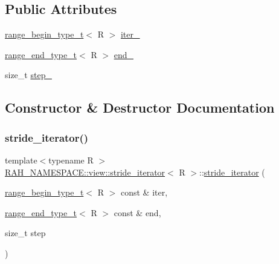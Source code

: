 \subsection*{Public Attributes}
\begin{DoxyCompactItemize}
\item 
\mbox{\hyperlink{namespace_r_a_h___n_a_m_e_s_p_a_c_e_a46705781d6869d5151141f871ced1e9c}{range\+\_\+begin\+\_\+type\+\_\+t}}$<$ R $>$ \mbox{\hyperlink{struct_r_a_h___n_a_m_e_s_p_a_c_e_1_1view_1_1stride__iterator_a361d1587d1a44aaa7b224e220c100c9e}{iter\+\_\+}}
\item 
\mbox{\hyperlink{namespace_r_a_h___n_a_m_e_s_p_a_c_e_aadeb8c12d454f4cc70bf80766871d3b2}{range\+\_\+end\+\_\+type\+\_\+t}}$<$ R $>$ \mbox{\hyperlink{struct_r_a_h___n_a_m_e_s_p_a_c_e_1_1view_1_1stride__iterator_a6c7ad4728a22048143949c4425438e53}{end\+\_\+}}
\item 
size\+\_\+t \mbox{\hyperlink{struct_r_a_h___n_a_m_e_s_p_a_c_e_1_1view_1_1stride__iterator_a66a5065ce36aca56255bd68127b9706f}{step\+\_\+}}
\end{DoxyCompactItemize}


\subsection{Constructor \& Destructor Documentation}
\mbox{\label{struct_r_a_h___n_a_m_e_s_p_a_c_e_1_1view_1_1stride__iterator_a4aeb915e3f46829e15c6dcbb7f7fae56}} 
\subsubsection{\texorpdfstring{stride\_iterator()}{stride\_iterator()}}
{\footnotesize\ttfamily template$<$typename R $>$ \\
\mbox{\hyperlink{struct_r_a_h___n_a_m_e_s_p_a_c_e_1_1view_1_1stride__iterator}{R\+A\+H\+\_\+\+N\+A\+M\+E\+S\+P\+A\+C\+E\+::view\+::stride\+\_\+iterator}}$<$ R $>$\+::\mbox{\hyperlink{struct_r_a_h___n_a_m_e_s_p_a_c_e_1_1view_1_1stride__iterator}{stride\+\_\+iterator}} (\begin{DoxyParamCaption}\item[{\mbox{\hyperlink{namespace_r_a_h___n_a_m_e_s_p_a_c_e_a46705781d6869d5151141f871ced1e9c}{range\+\_\+begin\+\_\+type\+\_\+t}}$<$ R $>$ const \&}]{iter,  }\item[{\mbox{\hyperlink{namespace_r_a_h___n_a_m_e_s_p_a_c_e_aadeb8c12d454f4cc70bf80766871d3b2}{range\+\_\+end\+\_\+type\+\_\+t}}$<$ R $>$ const \&}]{end,  }\item[{size\+\_\+t}]{step }\end{DoxyParamCaption})\hspace{0.3cm}{\ttfamily [inline]}}



